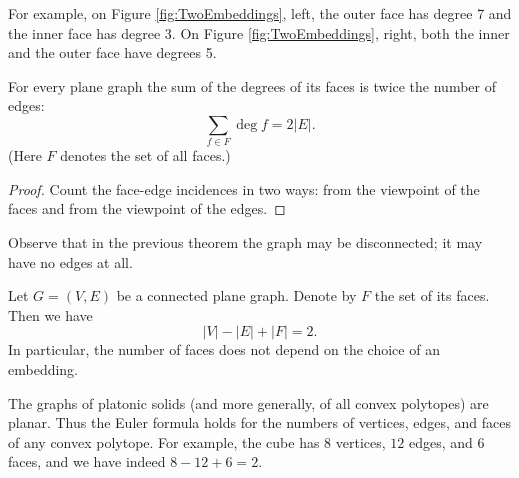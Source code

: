 \begin{page}
\setcounter{section}{3}
\setcounter{subsection}{2}
\setcounter{dfn}{5}
\label{portion:336}

For example, on Figure \ref{fig:TwoEmbeddings}, left, the outer face has degree 7 and the inner face has degree 3.
On Figure \ref{fig:TwoEmbeddings}, right, both the inner and the outer face have degrees 5.


\end{page}

\begin{page}
\setcounter{section}{3}
\setcounter{subsection}{2}
\setcounter{dfn}{6}
\label{portion:338}

\begin{thm}
\label{thm:DualHandshake}
For every plane graph the sum of the degrees of its faces is twice the number of edges:
\[
\sum_{f \in F} \deg f = 2 |E|.
\]
(Here $F$ denotes the set of all faces.)
\end{thm}

\end{page}

\begin{page}
\setcounter{section}{3}
\setcounter{subsection}{2}
\setcounter{dfn}{6}
\label{portion:339}

\begin{proof}
Count the face-edge incidences in two ways:
from the viewpoint of the faces and from the viewpoint of the edges.
\end{proof}
Observe that in the previous theorem the graph may be disconnected; it may have no edges at all.


\end{page}

\begin{page}
\setcounter{section}{3}
\setcounter{subsection}{2}
\setcounter{dfn}{7}
\label{portion:341}

\begin{thm}[Euler]
Let $G = (V, E)$ be a connected plane graph.
Denote by $F$ the set of its faces.
Then we have
\[
|V| - |E| + |F| = 2.
\]
In particular, the number of faces does not depend on the choice of an embedding.
\end{thm}

\end{page}

\begin{page}
\setcounter{section}{3}
\setcounter{subsection}{2}
\setcounter{dfn}{8}
\label{portion:344}

\begin{exl}
The graphs of platonic solids (and more generally, of all convex polytopes) are planar.
Thus the Euler formula holds for the numbers of vertices, edges, and faces of any convex polytope.
For example, the cube has $8$ vertices, $12$ edges, and $6$ faces, and we have indeed $8-12+6=2$.
\end{exl}

\end{page}

